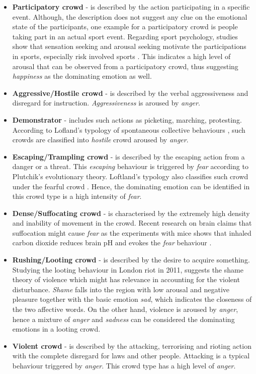 \begin{itemize}
\item \textbf{Participatory crowd} - is described by the action participating in a specific event. Although, the description does not suggest any clue on the emotional state of the participants, one example for a participatory crowd is people taking part in an actual sport event. Regarding sport psychology, studies show that sensation seeking and arousal seeking motivate the participations in sports, especially risk involved sports \citep{rowland1986sensation}. This indicates a high level of arousal that can be observed from a participatory crowd, thus suggesting \textit{happiness} as the dominating emotion as well.

\item \textbf{Aggressive/Hostile crowd} - is described by the verbal aggressiveness and disregard for instruction. \textit{Aggressiveness} is aroused by \textit{anger}.

\item \textbf{Demonstrator} - includes such actions as picketing, marching, protesting. According to Lofland's typology of spontaneous collective behaviours \citep{Kornblum2011}, such crowds are classified into \textit{hostile} crowd aroused by \textit{anger}.

\item \textbf{Escaping/Trampling crowd} - is described by the escaping action from a danger or a threat. This \textit{escaping} behaviour is triggered by \textit{fear} according to Plutchik's evolutionary theory. Loftland's typology also classifies such crowd under the fearful crowd \cite{Kornblum2011}. Hence, the dominating emotion can be identified in this crowd type is a high intensity of \textit{fear}.

\item \textbf{Dense/Suffocating crowd} - is characterised by the extremely high density and inability of movement in the crowd. Recent research on brain claims that suffocation might cause \textit{fear} as the experiments with mice shows that inhaled carbon dioxide reduces brain pH and evokes the \textit{fear} behaviour \citep{ziemann2009amygdala}.

\item \textbf{Rushing/Looting crowd} - is described by the desire to acquire something. Studying the looting behaviour in London riot in 2011, \citet{ray2014shame} suggests the shame theory of violence which might has relevance in accounting for the violent disturbance. \textit{Shame} falls into the region with low arousal and negative pleasure together with the basic emotion \textit{sad}, which indicates the closeness of the two affective words. On the other hand, violence is aroused by \textit{anger}, hence a mixture of \textit{anger} and \textit{sadness} can be considered the dominating emotions in a looting crowd.

\item \textbf{Violent crowd} - is described by the attacking, terrorising and rioting action with the complete disregard for laws and other people. Attacking is a typical behaviour triggered by \textit{anger}. This crowd type has a high level of \textit{anger}.
\end{itemize}

